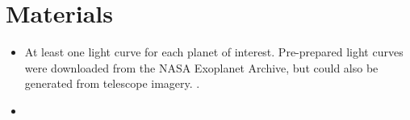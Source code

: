 \section{Materials}

\begin{itemize}
    \item At least one light curve for each planet of interest. Pre-prepared light curves were downloaded from the NASA Exoplanet Archive, but could
        also be generated from telescope imagery. \autocite{exoplanetArchive}.
    \item 
\end{itemize}
